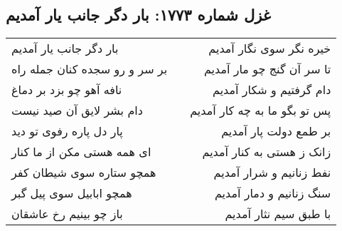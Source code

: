 \begin{center}
\section*{غزل شماره ۱۷۷۳: بار دگر جانب یار آمدیم}
\label{sec:1773}
\begin{longtable}{l p{0.5cm} r}
بار دگر جانب یار آمدیم
&&
خیره نگر سوی نگار آمدیم
\\
بر سر و رو سجده کنان جمله راه
&&
تا سر آن گنج چو مار آمدیم
\\
نافه آهو چو بزد بر دماغ
&&
دام گرفتیم و شکار آمدیم
\\
دام بشر لایق آن صید نیست
&&
پس تو بگو ما به چه کار آمدیم
\\
پار دل پاره رفوی تو دید
&&
بر طمع دولت پار آمدیم
\\
ای همه هستی مکن از ما کنار
&&
زانک ز هستی به کنار آمدیم
\\
همچو ستاره سوی شیطان کفر
&&
نفط زنانیم و شرار آمدیم
\\
همچو ابابیل سوی پیل گبر
&&
سنگ زنانیم و دمار آمدیم
\\
باز چو بینیم رخ عاشقان
&&
با طبق سیم نثار آمدیم
\\
\end{longtable}
\end{center}
